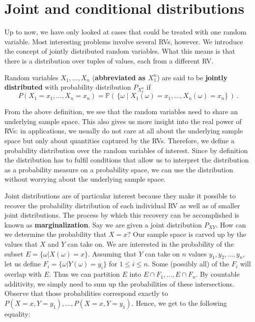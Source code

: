 \section{Joint and conditional distributions}

Up to now, we have only looked at cases that could be treated with one random variable. Most interesting problems involve several RVs, however. We introduce the concept of jointly distributed random variables. What this means is that
there is a distribution over tuples of values, each from a different RV.

\begin{Definition}
Random variables $ X_{1}, \ldots, X_{n} $ (\textbf{abbreviated as $ X^{n}_{1} $}) 
are said to be \textbf{jointly distributed} with probability distribution $ P_{X_{1}^{n}} $ if
$$ P(X_{1}=x_{1}, \ldots, X_{n}=x_{n}) = \mathbb{P}(\, \{\omega \mid
X_{1}(\omega) = x_{1}, \ldots, X_{n}(\omega)=x_{n}\}\, ) \, . $$ 
\end{Definition}

From the above definition, we see that the random variables need to
share an underlying sample space. This also gives us more insight into
the real power of RVs: in applications, we usually do not care at all
about the underlying sample space but only about quantities
captured by the RVs. Therefore, we define a probability distribution over the
random variables of interest. Since by definition the distribution has
to fulfil conditions that allow us to interpret the distribution
as a probability measure on a probability space, we can use the distribution without worrying
about the underlying sample space.

Joint distributions are of particular interest because they make it possible to recover the probability distribution of each individual
RV as well as of smaller joint distributions. The process by which this recovery can be accomplished is known as \textbf{marginalization}. Say
we are given a joint distribution $ P_{XY} $. How can we determine the probability that $ X=x $? Our sample space is carved
up by the values that $ X $ and $ Y $ can take on. We are interested in the probability of the subset $ E = \{\omega|X(\omega)=x\} $.
Assuming that $ Y $ can take on $ n $ values $y_1,y_2,\ldots,y_n$, let us define $ F_{i} = \{\omega| Y(\omega) = y_{i}\} $ for $ 1 \leq i \leq n $.
Some (possibly all) of the $ F_{i} $ will overlap with $ E $. Thus we can partition $ E $ into $ E\cap F_{1}, \ldots, E \cap F_{n} $.
By countable additivity, we simply need to sum up the probabilities of these intersections. Observe that those probabilities correspond exactly to $ P(X=x,Y=y_{1}), \ldots, P(X=x,Y=y_{1}) $. Hence, we get to the following equality:

